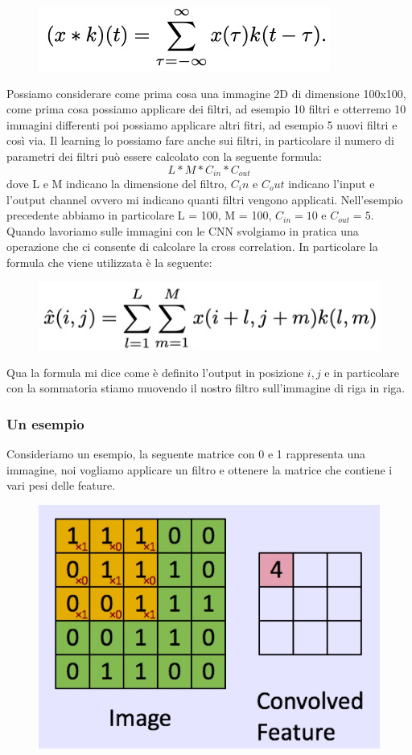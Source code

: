 \documentclass[14pt]{extreport}
\begin{document}
\begin{figure}[H]
	\centering
	\includegraphics[width=0.7\linewidth]{403.jpeg}
\end{figure}

Possiamo considerare come prima cosa una immagine 2D di dimensione 100x100, come prima cosa possiamo applicare dei filtri, ad esempio 10 filtri e
otterremo 10 immagini differenti poi possiamo applicare altri fitri, ad esempio 5 nuovi filtri e così via. Il learning lo possiamo fare anche sui
filtri, in particolare il numero di parametri dei filtri può essere calcolato con la seguente formula: $$L*M*C_{in}*C_{out}$$ dove L e M indicano la
dimensione del filtro, $C_in$ e $C_out$ indicano l'input e l'output channel ovvero mi indicano quanti filtri vengono applicati. Nell'esempio
precedente abbiamo in particolare L = 100, M = 100, $C_{in} = 10$ e $C_{out} = 5$. Quando lavoriamo sulle immagini con le CNN svolgiamo in pratica una
operazione che ci consente di calcolare la cross correlation. In particolare la formula che viene utilizzata è la seguente:

\begin{figure}[H]
	\centering
	\includegraphics[width=0.7\linewidth]{405.jpeg}
\end{figure}

Qua la formula mi dice come è definito l'output in posizione $i,j$ e in particolare con la sommatoria stiamo muovendo il nostro filtro sull'immagine
di riga in riga.

\subsubsection{Un esempio}

Consideriamo un esempio, la seguente matrice con 0 e 1 rappresenta una immagine, noi vogliamo applicare un filtro e ottenere la matrice che contiene i
vari pesi delle feature.

\begin{figure}[H]
	\centering
	\includegraphics[width=0.7\linewidth]{406.jpeg}
\end{figure}
\end{document}
